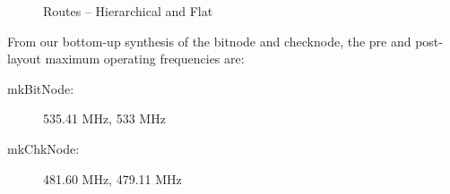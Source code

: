 \documentclass[11pt, a4paper]{article}
\begin{document}
\begin{figure}[!ht]
   \caption{Routes -- Hierarchical and Flat}
\end{figure}

From our bottom-up synthesis of the bitnode and checknode, the pre and
post-layout maximum operating frequencies are:

\begin{description}
   \item[mkBitNode:] 535.41 MHz, 533 MHz
   \item[mkChkNode:] 481.60 MHz, 479.11 MHz
\end{description}

\appendix


\end{document}
